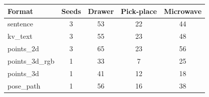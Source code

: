 \begin{tabular}{lcccc}
\toprule
Format & Seeds & Drawer & Pick-place & Microwave \\
\midrule
sentence & 3 & 53 & 22 & 44 \\
kv\_text & 3 & 55 & 23 & 48 \\
points\_2d & 3 & 65 & 23 & 56 \\
points\_3d\_rgb & 1 & 33 & 7 & 25 \\
points\_3d & 1 & 41 & 12 & 18 \\
pose\_path & 1 & 56 & 16 & 38 \\
\bottomrule
\end{tabular}
